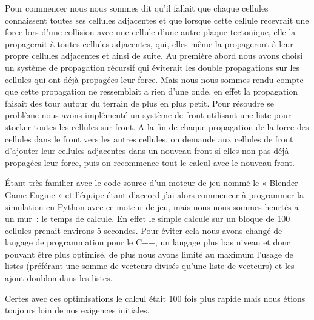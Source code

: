 \documentclass[a4paper,10pt]{article}
\begin{document}
Pour commencer nous nous sommes dit qu'il fallait que chaque cellules connaissent toutes ses cellules adjacentes et que lorsque cette cellule recevrait une force lors d'une collision avec une cellule d'une autre plaque tectonique, elle la propagerait à toutes cellules adjacentes, qui, elles même la propageront à leur propre cellules adjacentes et ainsi de suite.
Au première abord nous avons choisi un système de propagation récursif qui éviterait les double propagations sur les cellules qui ont déjà propagées leur force.
Mais nous nous sommes rendu compte que cette propagation ne ressemblait a rien d'une onde, en effet la propagation faisait des tour autour du terrain de plus en plus petit.
Pour résoudre se problème nous avons implémenté un système de front utilisant une liste pour stocker toutes les cellules sur front.
A la fin de chaque propagation de la force des cellules dans le front vers les autres cellules, on demande aux cellules de front d'ajouter leur cellules adjacentes dans un nouveau front si elles non pas déjà propagées leur force, puis on recommence tout le calcul avec le nouveau front.

Étant très familier avec le code source d'un moteur de jeu nommé le « Blender Game Engine » et l'équipe étant d'accord j'ai alors commencer à programmer la simulation en Python avec ce moteur de jeu, mais nous nous sommes heurtés a un mur~: le temps de calcule.
En effet le simple calcule sur un bloque de  100 cellules prenait environs 5 secondes.
Pour éviter cela nous avons changé de langage de programmation pour le C++, un langage plus bas niveau et donc pouvant être plus optimisé, de plus nous avons limité au maximum l'usage de listes (préférant une somme de vecteurs divisés qu'une liste de vecteurs) et les ajout doublon dans les listes.

Certes avec ces optimisations le calcul était 100 fois plus rapide mais nous étions toujours loin de nos exigences initiales.
\end{document}
